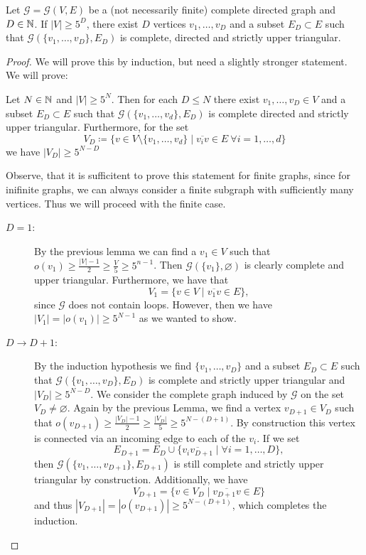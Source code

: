 \begin{lemma}[{\cite[Lemma~A.8]{MR3509968}}]
  \label{lem:A.8}
  Let \(\mathcal{G} = \mathcal{G}(V,E)\) be a (not necessarily finite) complete directed graph and \(D \in \mathbb{N}\). If \(|V| \geq 5^D\), there exist \(D\) vertices \(v_1, \dots, v_D\) and a subset \(E_D \subset E\) such that \(\mathcal{G}(\{v_1, \dots, v_D\}, E_D)\) is complete, directed and strictly upper triangular.
\end{lemma}

\begin{proof}
  We will prove this by induction, but need a slightly stronger statement. We will prove:

  Let \(N \in \mathbb{N}\) and \(|V| \geq 5^N\). Then for each \(D \leq N\) there exist \(v_1,\dots, v_D \in V\) and a subset \(E_D \subset E\) such that \(\mathcal{G}(\{v_1, \dots, v_d\}, E_D)\) is complete directed and strictly upper triangular. Furthermore, for the set
  \[
    V_D \coloneqq \{v \in V \setminus \{v_1, \dots, v_d\} \mid \overline{v_iv} \in E\ \forall i =1,\dots, d\}
  \]
  we have \(|V_D| \geq 5^{N-D}\)

  Observe, that it is sufficitent to prove this statement for finite graphs, since for inifinite graphs, we can always consider a finite subgraph with sufficiently many vertices. Thus we will proceed with the finite case.
  \begin{description}
  \item[\(D = 1\):] By the previous lemma we can find a \(v_1 \in V\) such that \(o(v_1) \geq \frac{|V| - 1}{2} \geq \frac{V}{5} \geq 5^{n-1}\). Then \(\mathcal{G}(\{v_1\}, \varnothing)\) is clearly complete and upper triangular. Furthermore, we have that
    \[
      V_1 = \{v \in V \mid \overline{v_1v} \in E\},
    \]
    since \(\mathcal{G}\) does not contain loops. However, then we have \(|V_1| = |o(v_1)| \geq 5^{N-1}\) as we wanted to show.
  \item[\(D \to D+1\):] By the induction hypothesis we find \(\{v_1, \dots, v_D\}\) and a subset \(E_D \subset E\) such that \(\mathcal{G}(\{v_1, \dots, v_D\}, E_D)\) is complete and strictly upper triangular and \(|V_D| \geq 5^{N-D}\). We consider the complete graph induced by \(\mathcal{G}\) on the set \(V_D \neq \varnothing\). Again by the previous Lemma, we find a vertex \(v_{D+1} \in V_D\) such that \(o(v_{D+1}) \geq \frac{|V_D| -1}{2} \geq \frac{|V_D|}{5} \geq 5^{N - (D+1)}\). By construction this vertex is connected via an incoming edge to each of the \(v_i\). If we set
    \[
      E_{D+1} = E_D \cup \{\overline{v_iv_{D+1}} \mid \forall i = 1, \dots, D\},
    \]
    then \(\mathcal{G}(\{v_1, \dots, v_{D+1}\}, E_{D+1})\) is still complete and strictly upper triangular by construction. Additionally, we have
    \[
      V_{D+1} = \{v \in V_D \mid \overline{v_{D+1}v} \in E\}
    \]
    and thus \(|V_{D+1}| = |o(v_{D+1})| \geq 5^{N- (D+1)}\), which completes the induction.
  \end{description}
\end{proof}

